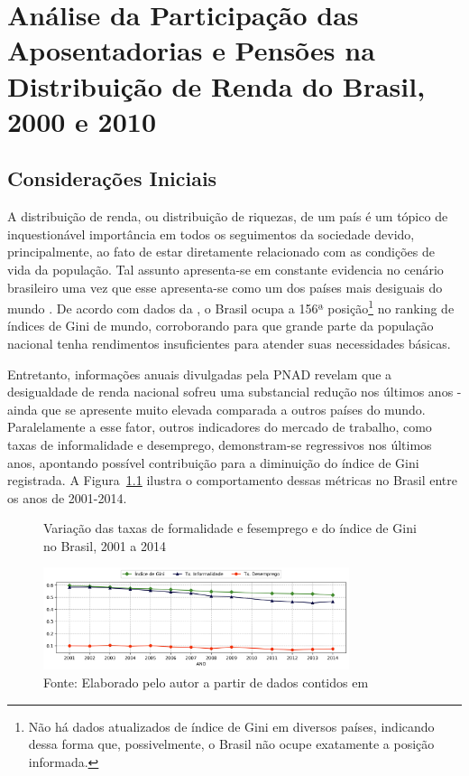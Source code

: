 \chapter{Análise da Participação das Aposentadorias e Pensões na Distribuição de Renda do Brasil, 2000 e 2010}

\section{Considerações Iniciais}

A distribuição de renda, ou distribuição de riquezas, de um país é um tópico de inquestionável importância em todos os seguimentos da sociedade devido, principalmente, ao fato de estar diretamente relacionado com as condições de vida da população. Tal assunto apresenta-se em constante evidencia no cenário brasileiro uma vez que esse apresenta-se como um dos países mais desiguais do mundo \cite{cap04_ref2, cap04_ref3}. De acordo com dados da \cite{cap04_ref1}, o Brasil ocupa a 156ª posição\footnote{Não há dados atualizados de índice de Gini em diversos países, indicando dessa forma que, possivelmente, o Brasil não ocupe exatamente a posição informada.}  no ranking de índices de Gini de mundo, corroborando para que grande parte da população nacional tenha rendimentos insuficientes para atender suas necessidades básicas.

Entretanto, informações anuais divulgadas pela PNAD revelam que a desigualdade de renda nacional sofreu uma substancial redução nos últimos anos \cite{cap04_ref4} - ainda que se apresente muito elevada comparada a outros países do mundo. Paralelamente a esse fator, outros indicadores do mercado de trabalho, como taxas de informalidade e desemprego, demonstram-se regressivos nos últimos anos, apontando possível contribuição para a diminuição do índice de Gini registrada. A Figura~\ref{fig:cap04:gini_taxas} ilustra o comportamento dessas métricas no Brasil entre os anos de 2001-2014.

\begin{figure}[!h]
    \centering
    \caption{Variação das taxas de formalidade e fesemprego e do índice de Gini no Brasil, 2001 a 2014}
    \includegraphics[width=0.8\textwidth]{figs/cap04_gini_taxas.pdf}
    \caption*{\footnotesize{Fonte: Elaborado pelo autor a partir de dados contidos em  \cite{cap04_ref4}}}
    \label{fig:cap04:gini_taxas}
\end{figure}

